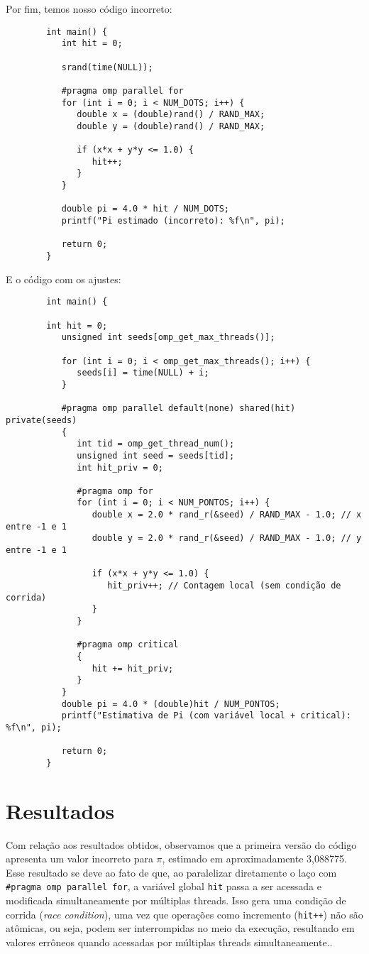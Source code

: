 \documentclass[a4paper, 12pt]{article}
\begin{document}
	Por fim, temos nosso código incorreto: 
	
	\begin{verbatim}
		int main() {
		   int hit = 0;
			
		   srand(time(NULL));
		
		   #pragma omp parallel for
		   for (int i = 0; i < NUM_DOTS; i++) {
		      double x = (double)rand() / RAND_MAX;
		      double y = (double)rand() / RAND_MAX;
				
		      if (x*x + y*y <= 1.0) {
		         hit++;
		      }
		   }
			
		   double pi = 4.0 * hit / NUM_DOTS;
		   printf("Pi estimado (incorreto): %f\n", pi);
			
		   return 0;
		}
	\end{verbatim}
	
	E o código com os ajustes:
	
	\begin{verbatim}
		int main() {
		
		int hit = 0;
		   unsigned int seeds[omp_get_max_threads()];
		
		   for (int i = 0; i < omp_get_max_threads(); i++) {
		      seeds[i] = time(NULL) + i;
		   }
		
		   #pragma omp parallel default(none) shared(hit) private(seeds)
		   {
		      int tid = omp_get_thread_num();
		      unsigned int seed = seeds[tid];
		      int hit_priv = 0;
		
		      #pragma omp for
		      for (int i = 0; i < NUM_PONTOS; i++) {
		         double x = 2.0 * rand_r(&seed) / RAND_MAX - 1.0; // x entre -1 e 1
		         double y = 2.0 * rand_r(&seed) / RAND_MAX - 1.0; // y entre -1 e 1
		
		         if (x*x + y*y <= 1.0) {
		            hit_priv++; // Contagem local (sem condição de corrida)
		         }
		      }
		      
		      #pragma omp critical
		      {
		         hit += hit_priv;
		      }
		   }
		   double pi = 4.0 * (double)hit / NUM_PONTOS;
		   printf("Estimativa de Pi (com variável local + critical): %f\n", pi);
		
		   return 0;
		}
	\end{verbatim}
	
	\section{Resultados}
	\hspace{0.7cm}Com relação aos resultados obtidos, observamos que a primeira versão do código apresenta um valor incorreto para $\pi$, estimado em aproximadamente 3{,}088775. Esse resultado se deve ao fato de que, ao paralelizar diretamente o laço com \texttt{\#pragma omp parallel for}, a variável global \texttt{hit} passa a ser acessada e modificada simultaneamente por múltiplas threads. Isso gera uma condição de corrida (\textit{race condition}), uma vez que operações como incremento (\texttt{hit++}) não são atômicas, ou seja, podem ser interrompidas no meio da execução, resultando em valores errôneos quando acessadas por múltiplas threads simultaneamente..
	
\end{document}
